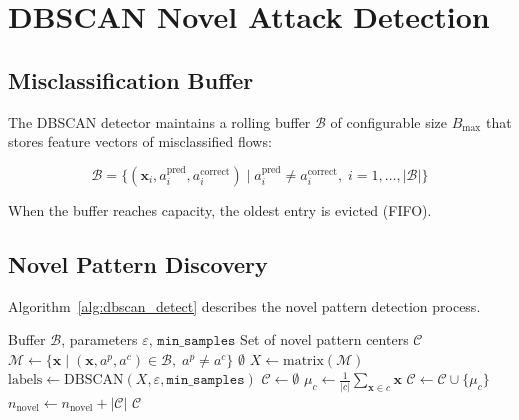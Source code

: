 \documentclass[12pt, letterpaper, oneside]{report}
\newcommand{\bx}{\mathbf{x}}
\begin{document}
\section{DBSCAN Novel Attack Detection}
\label{sec:dbscan}

\subsection{Misclassification Buffer}

The DBSCAN detector maintains a rolling buffer $\mathcal{B}$ of configurable size $B_{\max}$ that stores feature vectors of misclassified flows:

\begin{equation}
\label{eq:buffer}
\mathcal{B} = \{(\bx_i, a_i^{\text{pred}}, a_i^{\text{correct}}) \mid a_i^{\text{pred}} \neq a_i^{\text{correct}}, \; i = 1, \ldots, |\mathcal{B}|\}
\end{equation}

When the buffer reaches capacity, the oldest entry is evicted (FIFO).

\subsection{Novel Pattern Discovery}

Algorithm~\ref{alg:dbscan_detect} describes the novel pattern detection process.

\begin{algorithm}[htbp]
\caption{DBSCAN Novel Attack Pattern Detection}
\label{alg:dbscan_detect}
\begin{algorithmic}[1]
\Require Buffer $\mathcal{B}$, parameters $\varepsilon$, $\texttt{min\_samples}$
\Ensure Set of novel pattern centers $\mathcal{C}$
\State $\mathcal{M} \leftarrow \{\bx \mid (\bx, a^p, a^c) \in \mathcal{B}, \; a^p \neq a^c\}$ 
    \State \Return $\emptyset$
\EndIf
\State $X \leftarrow \text{matrix}(\mathcal{M})$
\State $\text{labels} \leftarrow \text{DBSCAN}(X, \varepsilon, \texttt{min\_samples})$
\State $\mathcal{C} \leftarrow \emptyset$
    \State $\mu_c \leftarrow \frac{1}{|c|} \sum_{\bx \in c} \bx$ 
    \State $\mathcal{C} \leftarrow \mathcal{C} \cup \{\mu_c\}$
\EndFor
\State $n_{\text{novel}} \leftarrow n_{\text{novel}} + |\mathcal{C}|$
\State \Return $\mathcal{C}$
\end{algorithmic}
\end{algorithm}
\end{document}
